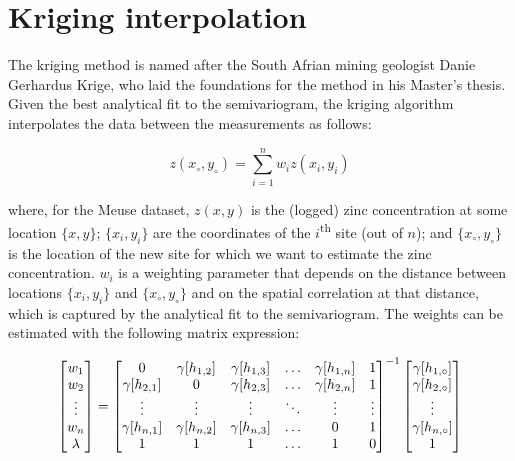 \section{Kriging interpolation}
\label{sec:kriging}

The kriging method is named after the South Afrian mining geologist
Danie Gerhardus Krige, who laid the foundations for the method in his
Master's thesis.  Given the best analytical fit to the semivariogram,
the kriging algorithm interpolates the data between the measurements
as follows:

\begin{equation}
z(x_\circ,y_\circ) = \sum\limits_{i=1}^n w_i z(x_i,y_i)
\label{eq:kriging}
\end{equation}

\noindent where, for the Meuse dataset, $z(x,y)$ is the (logged) zinc
concentration at some location $\{x,y\}$; $\{x_i,y_i\}$ are the
coordinates of the $i$\textsuperscript{th} site (out of $n$); and
$\{x_\circ,y_\circ\}$ is the location of the new site for which we
want to estimate the zinc concentration. $w_i$ is a weighting
parameter that depends on the distance between locations $\{x_i,y_i\}$
and $\{x_\circ,y_\circ\}$ and on the spatial correlation at that
distance, which is captured by the analytical fit to the
semivariogram. The weights can be estimated with the following matrix
expression:

\begin{equation}
  \left[
    \begin{array}{@{}c@{}}
      w_1 \\
      w_2 \\
      \vdots \\
      w_n \\
      \lambda
    \end{array}
    \right]
  =
  \left[
    \begin{array}{@{}cccccc@{}}
      0 & \gamma[h_{1,2}] & \gamma[h_{1,3}] & \ldots & \gamma[h_{1,n}] & 1 \\
      \gamma[h_{2,1}] & 0 & \gamma[h_{2,3}] & \ldots & \gamma[h_{2,n}] & 1 \\
      \vdots & \vdots & \vdots & \ddots & \vdots & \vdots \\
      \gamma[h_{n,1}] & \gamma[h_{n,2}] & \gamma[h_{n,3}] & \ldots & 0 & 1 \\
      1 & 1 & 1 & \ldots & 1 & 0 \\
    \end{array}
    \right]^{-1}
  \left[
    \begin{array}{@{}c@{}}
      \gamma[h_{1,\circ}] \\
      \gamma[h_{2,\circ}] \\
      \vdots \\
      \gamma[h_{n,\circ}]\\
      1
    \end{array}
    \right]
\label{eq:krigingweights}
\end{equation}

